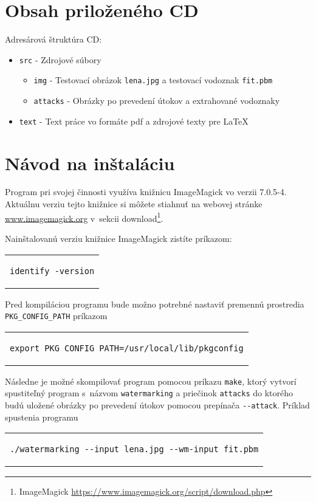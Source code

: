 \chapter{Obsah priloženého CD}
Adresárová štruktúra CD:
\begin{itemize}
    \item {\tt src} - Zdrojové súbory
    \begin{itemize}
        \item {\tt img} - Testovací obrázok {\tt lena.jpg} a testovací vodoznak {\tt fit.pbm}
        \item {\tt attacks} - Obrázky po prevedení útokov a extrahované vodoznaky
    \end{itemize}
    \item {\tt text} - Text práce vo formáte pdf a zdrojové texty pre  \LaTeX

\end{itemize}

\chapter{Návod na inštaláciu}
Program pri svojej činnosti využíva knižnicu ImageMagick vo verzii 7.0.5-4. Aktuálnu verziu tejto knižnice si môžete stiahnuť na webovej stránke \url{www.imagemagick.org} v~sekcii download\footnote{ImageMagick \url{https://www.imagemagick.org/script/download.php}}.

Nainštalovanú verziu knižnice ImageMagick zistíte príkazom:
\begin{center}
\begin{tabular}{c}
\begin{lstlisting}
identify -version
\end{lstlisting}
\end{tabular}
\end{center}

Pred kompiláciou programu bude možno potrebné nastaviť premennú prostredia\\ \verb|PKG_CONFIG_PATH| príkazom
\begin{center}
\begin{tabular}{c}
\begin{lstlisting}
export PKG_CONFIG_PATH=/usr/local/lib/pkgconfig
\end{lstlisting}
\end{tabular}
\end{center}

Následne je možné skompilovať program pomocou príkazu {\tt make}, ktorý vytvorí spustiteľný program s~názvom {\tt watermarking} a priečinok {\tt attacks} do ktorého budú uložené obrázky po prevedení útokov pomocou prepínača \verb|--attack|. Príklad spustenia programu
\begin{center}
\begin{tabular}{c}
\begin{lstlisting}
./watermarking --input lena.jpg --wm-input fit.pbm
\end{lstlisting}
\end{tabular}
\end{center}